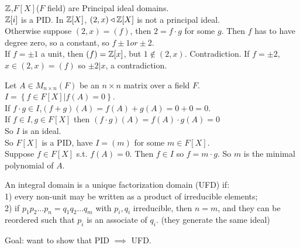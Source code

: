 \documentclass[a4paper]{article}
\begin{document}
\begin{eg}
$\mathbb{Z}$,$F[X]$($F$ field) are Principal ideal domains.\\
$\mathbb{Z}[i]$ is a PID.
In $\mathbb{Z}[X]$, $\left(2,x\right)\triangleleft \mathbb{Z}[X]$ is not a principal ideal.\\
Otherwise suppose $\left(2,x\right)=\left(f\right)$, then $2=f\cdot g$ for some $g$. Then $f$ has to have degree zero, so a constant, so $f\pm 1 or \pm 2$.\\
If $f=\pm 1$ a unit, then $\left(f\right)=\mathbb{Z}[x]$, but $1\notin \left(2,x\right)$. Contradiction.
If $f=\pm 2$, $x\in \left(2,x\right)=\left(f\right)$ so $\pm 2 | x$, a contradiction.
\end{eg}

\begin{eg}
Let $A\in M_{n\times n} \left(F\right)$ be an $n\times n$ matrix over a field $F$.\\
$I=\left\{f\in F[X]|f\left(A\right)=0\right\}$.\\
If $f\cdot g\in I$,$\left(f+g\right)\left(A\right)=f\left(A\right)+g\left(A\right)=0+0=0$.\\
If $f\in I, g\in F[X]$ then $\left(f\cdot g\right)\left(A\right)=f\left(A\right) \cdot g\left(A\right)=0$\\
So $I$ is an ideal.\\
So $F[X]$ is a PID, have $I=\left(m\right)$ for some $m\in F[X]$.\\
Suppose $f\in F[X]$ s.t. $f\left(A\right)=0$. Then $f\in I$ so $f=m\cdot g$. So $m$ is the minimal polynomial of $A$.
\end{eg}

\begin{defi}
An integral domain is a unique factorization domain (UFD) if:\\
1) every non-unit may be written as a product of irreducible elements;\\
2) if $p_{1}p_{2}...p_{n}=q_{1}q_{2}...q_{m}$ with $p_{i},q_{i}$ irreducible, then $n=m$, and they can be reordered such that $p_{i}$ is an associate of $q_{i}$. (they generate the same ideal)\\
\end{defi}

Goal: want to show that PID $\implies$ UFD.\\
\end{document}
